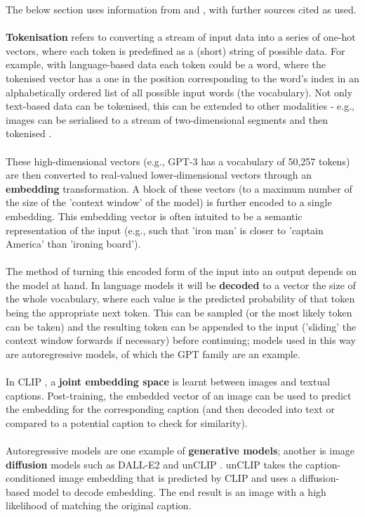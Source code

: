 The below section uses information from \cite{firoozi2023foundation} and \cite{hu2023generalpurpose}, with further sources cited as used.
\\ \\
\textbf{Tokenisation} refers to converting a stream of input data into a series of one-hot vectors, where each token is predefined as a (short) string of possible data. For example, with language-based data each token could be a word, where the tokenised vector has a one in the position corresponding to the word's index in an alphabetically ordered list of all possible input words (the vocabulary). Not only text-based data can be tokenised, this can be extended to other modalities - e.g., images can be serialised to a stream of two-dimensional segments and then tokenised \cite{Yu2022CoCa:}.
\\ \\
These high-dimensional vectors (e.g., GPT-3 has a vocabulary of 50,257 tokens) are then converted to real-valued lower-dimensional vectors through an \textbf{embedding} transformation. A block of these vectors (to a maximum number of the size of the 'context window' of the model) is further encoded to a single embedding. This embedding vector is often intuited to be a semantic representation of the input (e.g., such that 'iron man' is closer to 'captain America' than 'ironing board').
\\ \\
The method of turning this encoded form of the input into an output depends on the model at hand. In language models it will be \textbf{decoded} to a vector the size of the whole vocabulary, where each value is the predicted probability of that token being the appropriate next token. This can be sampled (or the most likely token can be taken) and the resulting token can be appended to the input ('sliding' the context window forwards if necessary) before continuing; models used in this way are autoregressive models, of which the GPT family are an example.
\\ \\
In CLIP \cite{DBLP:journals/corr/abs-2103-00020}, a \textbf{joint embedding space} is learnt between images and textual captions. Post-training, the embedded vector of an image can be used to predict the embedding for the corresponding caption (and then decoded into text or compared to a potential caption to check for similarity).
\\ \\
Autoregressive models are one example of \textbf{generative models}; another is image \textbf{diffusion} models such as DALL-E2 and unCLIP \cite{ramesh2022hierarchical}. unCLIP takes the caption-conditioned image embedding that is predicted by CLIP and uses a diffusion-based model to decode embedding. The end result is an image with a high likelihood of matching the original caption.

